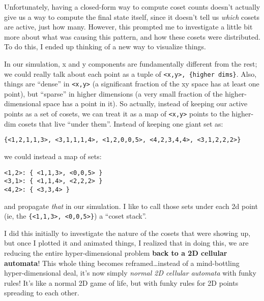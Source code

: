 \documentclass[]{article}
\begin{document}
Unfortunately, having a closed-form way to compute coset counts doesn't actually
give us a way to compute the final state itself, since it doesn't tell us
\emph{which} cosets are active, just how many. However, this prompted me to
investigate a little bit more about what was causing this pattern, and how these
cosets were distributed. To do this, I ended up thinking of a new way to
visualize things.

In our simulation, x and y components are fundamentally different from the rest;
we could really talk about each point as a tuple of
\texttt{\textless{}x,y\textgreater{},\ \{higher\ dims\}}. Also, things are
``dense'' in \texttt{\textless{}x,y\textgreater{}} (a significant fraction of
the xy space has at least one point), but ``sparse'' in higher dimensions (a
very small fraction of the higher-dimensional space has a point in it). So
actually, instead of keeping our active points as a set of cosets, we can treat
it as a map of \texttt{\textless{}x,y\textgreater{}} points to the higher-dim
cosets that live ``under them''. Instead of keeping one giant set as:

\begin{verbatim}
{<1,2,1,1,3>, <3,1,1,1,4>, <1,2,0,0,5>, <4,2,3,4,4>, <3,1,2,2,2>}
\end{verbatim}

we could instead a map of sets:

\begin{verbatim}
<1,2>: { <1,1,3>, <0,0,5> }
<3,1>: { <1,1,4>, <2,2,2> }
<4,2>: { <3,3,4> }
\end{verbatim}

and propagate \emph{that} in our simulation. I like to call those sets under
each 2d point (ie, the
\texttt{\{\textless{}1,1,3\textgreater{},\ \textless{}0,0,5\textgreater{}\}}) a
``coset stack''.

I did this initially to investigate the nature of the cosets that were showing
up, but once I plotted it and animated things, I realized that in doing this, we
are reducing the entire hyper-dimensional problem \textbf{back to a 2D cellular
automata}! This whole thing becomes reframed\ldots instead of a mind-bottling
hyper-dimensional deal, it's now simply \emph{normal 2D cellular automata} with
funky rules! It's like a normal 2D game of life, but with funky rules for 2D
points spreading to each other.
\end{document}
